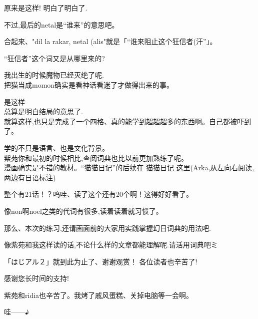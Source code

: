 原来是这样! 明白了明白了.

不过,最后的netal是``谁来''的意思吧。

合起来、"dil la rakar, netal (alis"就是「``谁来阻止这个狂信者(汗''」。

``狂信者''这个词又是从哪里来的?

我出生的时候魔物已经灭绝了呢.\\
把猫当成momon确实是看神话看迷了才做得出来的事。


是这样\FiveStar \\
总算是明白结局的意思了.\\
就算这样,也只是完成了一个四格、真的能学到超超超多的东西啊。自己都被吓到了。


学的不只是语言、也是文化背景。\\
紫苑你和最初的时候相比,查阅词典也比以前更加熟练了呢。\\
漫画确实是不错的教材。``猫猫日记''的后续在
{猫猫日记}
这里(Arka,从左向右阅读,两边有日语标注)





整个有21话！？呜哇、读了这个还有20个啊！这得好好看了。

像non啊noel之类的代词有很多,读着读着就习惯了。


那么、本次的练习,还请画面前的大家用实践掌握幻日词典的用法吧.

像紫苑和我这样读的话,不论什么样的文章都能理解呢.请活用词典吧\FiveStar ミ

「はじアル２」就到此为止了、谢谢观赏！
各位读者也辛苦了!


感谢您长时间的支持!

紫苑和ridia也辛苦了。我烤了戚风蛋糕、关掉电脑等一会啊。


哇------♪



